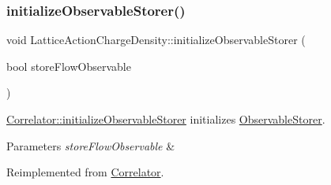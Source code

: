 \mbox{\label{class_lattice_action_charge_density_aba3131bbe5bd930adccc2852b4d44bb9}} 
\subsubsection{\texorpdfstring{initializeObservableStorer()}{initializeObservableStorer()}}
{\footnotesize\ttfamily void Lattice\+Action\+Charge\+Density\+::initialize\+Observable\+Storer (\begin{DoxyParamCaption}\item[{bool}]{store\+Flow\+Observable }\end{DoxyParamCaption})\hspace{0.3cm}{\ttfamily [virtual]}}



\mbox{\hyperlink{class_correlator_ab99886c09dd27dfc8676d0032cecf9bc}{Correlator\+::initialize\+Observable\+Storer}} initializes \mbox{\hyperlink{class_observable_storer}{Observable\+Storer}}. 


\begin{DoxyParams}{Parameters}
{\em store\+Flow\+Observable} & \\
\hline
\end{DoxyParams}


Reimplemented from \mbox{\hyperlink{class_correlator_ab99886c09dd27dfc8676d0032cecf9bc}{Correlator}}.

